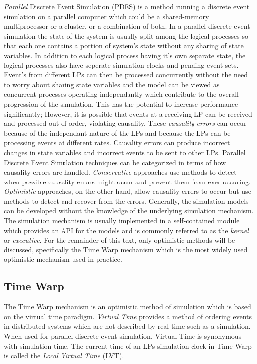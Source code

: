 \documentclass[11pt]{book}
\begin{document}
\emph{Parallel} Discrete Event Simulation (PDES) is a method running a discrete event
simulation on a parallel computer which could be a shared-memory multiprocessor or a
cluster, or a combination of both.  In a parallel discrete event simulation the state of
the system is usually split among the logical processes so that each one contains a portion
of system's state without any sharing of state variables\cite{fujimoto-90}.  In addition to
each logical process having it's own separate state, the logical processes also have seperate
simulation clocks and pending event sets.  Event's from different LPs can then be processed
concurrently without the need to worry about sharing state variables and the model can be
viewed as concurrent processes operating independantly which contribute to the overall
progression of the simulation.  This has the potential to increase performance significantly;
However, it is possible that events at a receiving LP can be received and processed out of
order, violating causality.  These \emph{causality errors} can occur because of the independant
nature of the LPs and because the LPs can be processing events at different rates.
Causality errors can produce incorrect changes in state variables and incorrect events to
be sent to other LPs.  Parallel Discrete Event Simulation techniques can be categorized in
terms of how causality errors are handled.  \emph{Conservative} approaches use methods to
detect when possible causality errors might occur and prevent them from ever occuring.
\emph{Optimistic} approaches, on the other hand, allow causality errors to occur but use
methods to detect and recover from the errors.  Generally, the simulation models can be
developed without the knowledge of the underlying simulation mechanism.  The simulation
mechanism is usually implemented in a self-contained module which provides an API for the
models and is commonly referred to as the \emph{kernel} or \emph{executive}.  For the remainder
of this text, only optimistic methods will be discussed, specifically the Time Warp mechanism
which is the most widely used optimistic mechanism used in practice.

\subsection{Time Warp}

The Time Warp mechanism is an optimistic method of simulation which is based on the virtual
time paradigm\cite{jefferson-85}.  \emph{Virtual Time} provides a method of ordering events
in distributed systems which are not described by real time such as a simulation.  When used
for parallel discrete event simulation, Virtual Time is synonymous with simulation time.
The current time of an LPs simulation clock in Time Warp is called the \emph{Local Virtual
Time} (LVT).
\end{document}
